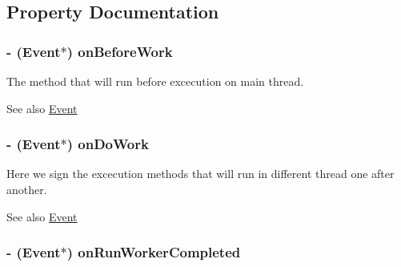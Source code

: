 \subsection{\-Property \-Documentation}
\hypertarget{interface_background_worker_abe061a3706b92b0a9f10998d6758a0db}{
\subsubsection[{on\-Before\-Work}]{\setlength{\rightskip}{0pt plus 5cm}-\/ ({\bf \-Event}$\ast$) on\-Before\-Work}}
\label{interface_background_worker_abe061a3706b92b0a9f10998d6758a0db}


\-The method that will run before excecution on main thread. 

\begin{DoxySeeAlso}{\-See also}
\hyperlink{interface_event}{\-Event} 
\end{DoxySeeAlso}
\hypertarget{interface_background_worker_a23f3772d45b9471294508281602196af}{
\subsubsection[{on\-Do\-Work}]{\setlength{\rightskip}{0pt plus 5cm}-\/ ({\bf \-Event}$\ast$) on\-Do\-Work}}
\label{interface_background_worker_a23f3772d45b9471294508281602196af}


\-Here we sign the excecution methods that will run in different thread one after another. 

\begin{DoxySeeAlso}{\-See also}
\hyperlink{interface_event}{\-Event} 
\end{DoxySeeAlso}
\hypertarget{interface_background_worker_a71f9bdc848a3ab29551644569db05ffa}{
\subsubsection[{on\-Run\-Worker\-Completed}]{\setlength{\rightskip}{0pt plus 5cm}-\/ ({\bf \-Event}$\ast$) on\-Run\-Worker\-Completed}}
\label{interface_background_worker_a71f9bdc848a3ab29551644569db05ffa}


